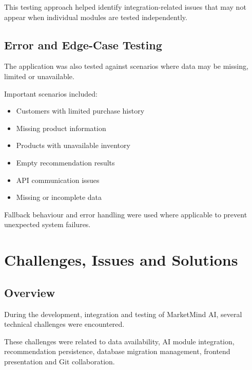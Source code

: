 \documentclass[12pt,a4paper]{report}
\begin{document}
This testing approach helped identify integration-related issues that
may not appear when individual modules are tested independently.



\section{Error and Edge-Case Testing}

The application was also tested against scenarios where data may be
missing, limited or unavailable.

Important scenarios included:

\begin{itemize}
    \item Customers with limited purchase history
    \item Missing product information
    \item Products with unavailable inventory
    \item Empty recommendation results
    \item API communication issues
    \item Missing or incomplete data
\end{itemize}

Fallback behaviour and error handling were used where applicable to
prevent unexpected system failures.

\newpage



\chapter{Challenges, Issues and Solutions}

\section{Overview}

During the development, integration and testing of MarketMind AI,
several technical challenges were encountered.

These challenges were related to data availability, AI module
integration, recommendation persistence, database migration management,
frontend presentation and Git collaboration.
\end{document}
